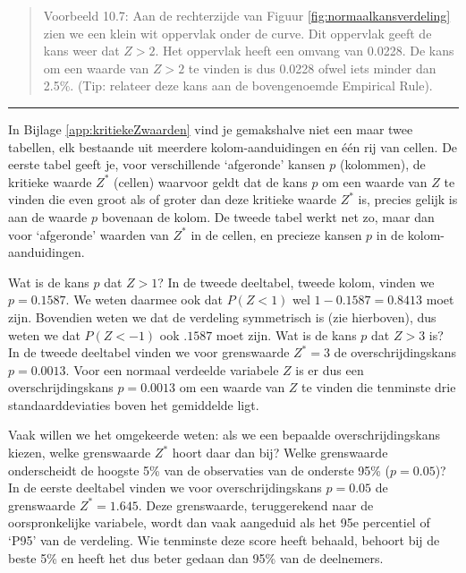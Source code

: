 \documentclass[
]{book}
\begin{document}
\begin{quote}
Voorbeeld 10.7: Aan de rechterzijde van Figuur \ref{fig:normaalkansverdeling} zien we een klein wit oppervlak onder de curve. Dit oppervlak geeft de kans weer dat \(Z>2\). Het oppervlak heeft een omvang van 0.0228. De kans om een waarde van \(Z>2\) te vinden is dus 0.0228 ofwel iets minder dan 2.5\%. (Tip: relateer deze kans aan de bovengenoemde Empirical Rule).
\end{quote}

\begin{center}\rule{0.5\linewidth}{0.5pt}\end{center}

In
Bijlage \ref{app:kritiekeZwaarden} vind je gemakshalve niet een maar twee
tabellen, elk bestaande uit meerdere kolom-aanduidingen en één rij van
cellen. De eerste tabel geeft je, voor verschillende `afgeronde' kansen
\(p\) (kolommen), de kritieke waarde \(Z^*\) (cellen) waarvoor geldt dat de
kans \(p\) om een waarde van \(Z\) te vinden die even groot als of groter
dan deze kritieke waarde \(Z^*\) is, precies gelijk is aan de waarde \(p\)
bovenaan de kolom. De tweede tabel werkt net zo, maar dan voor
`afgeronde' waarden van \(Z^*\) in de cellen, en precieze kansen \(p\) in de
kolom-aanduidingen.

Wat is de kans \(p\) dat \(Z>1\)? In de tweede deeltabel, tweede kolom,
vinden we \(p=0.1587\). We weten daarmee ook dat \(P(Z<1)\) wel
\(1-0.1587=0.8413\) moet zijn. Bovendien weten we dat de verdeling
symmetrisch is (zie hierboven), dus weten we dat \(P(Z< -1)\) ook \(.1587\)
moet zijn. Wat is de kans \(p\) dat \(Z>3\) is? In de tweede deeltabel
vinden we voor grenswaarde \(Z^*=3\) de overschrijdingskans
\(p=0.0013\). Voor een normaal verdeelde variabele \(Z\) is er dus een
overschrijdingskans \(p=0.0013\) om een waarde van \(Z\) te vinden die
tenminste drie standaarddeviaties boven het gemiddelde ligt.

Vaak willen we het omgekeerde weten: als we een bepaalde
overschrijdingskans kiezen, welke grenswaarde \(Z^*\) hoort daar dan bij?
Welke grenswaarde onderscheidt de hoogste 5\% van de observaties van de
onderste 95\% (\(p=0.05\))? In de eerste deeltabel vinden we
voor overschrijdingskans \(p=0.05\) de grenswaarde \(Z^*=1.645\). Deze
grenswaarde, teruggerekend naar de oorspronkelijke variabele, wordt dan
vaak aangeduid als het 95e percentiel of `P95' van de verdeling. Wie
tenminste deze score heeft behaald, behoort bij de beste 5\% en heeft het dus
beter gedaan dan 95\% van de deelnemers.
\end{document}
